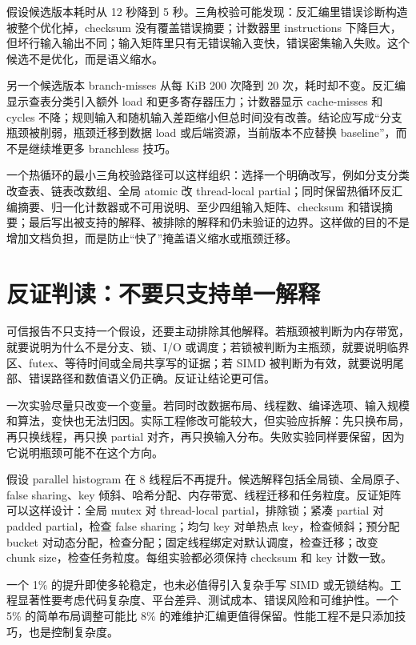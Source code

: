 假设候选版本耗时从 12 秒降到 5 秒。三角校验可能发现：反汇编里错误诊断构造被整个优化掉，checksum 没有覆盖错误摘要；计数器里 instructions 下降巨大，但坏行输入输出不同；输入矩阵里只有无错误输入变快，错误密集输入失败。这个候选不是优化，而是语义缩水。

另一个候选版本 branch-misses 从每 KiB 200 次降到 20 次，耗时却不变。反汇编显示查表分类引入额外 load 和更多寄存器压力；计数器显示 cache-misses 和 cycles 不降；规则输入和随机输入差距缩小但总时间没有改善。结论应写成“分支瓶颈被削弱，瓶颈迁移到数据 load 或后端资源，当前版本不应替换 baseline”，而不是继续堆更多 branchless 技巧。

一个热循环的最小三角校验路径可以这样组织：选择一个明确改写，例如分支分类改查表、链表改数组、全局 atomic 改 thread-local partial；同时保留热循环反汇编摘要、归一化计数器或不可用说明、至少四组输入矩阵、checksum 和错误摘要；最后写出被支持的解释、被排除的解释和仍未验证的边界。这样做的目的不是增加文档负担，而是防止“快了”掩盖语义缩水或瓶颈迁移。

\section{反证判读：不要只支持单一解释}

可信报告不只支持一个假设，还要主动排除其他解释。若瓶颈被判断为内存带宽，就要说明为什么不是分支、锁、I/O 或调度；若锁被判断为主瓶颈，就要说明临界区、futex、等待时间或全局共享写的证据；若 SIMD 被判断为有效，就要说明尾部、错误路径和数值语义仍正确。反证让结论更可信。

一次实验尽量只改变一个变量。若同时改数据布局、线程数、编译选项、输入规模和算法，变快也无法归因。实际工程修改可能较大，但实验应拆解：先只换布局，再只换线程，再只换 partial 对齐，再只换输入分布。失败实验同样要保留，因为它说明瓶颈可能不在这个方向。

假设 parallel histogram 在 8 线程后不再提升。候选解释包括全局锁、全局原子、false sharing、key 倾斜、哈希分配、内存带宽、线程迁移和任务粒度。反证矩阵可以这样设计：全局 mutex 对 thread-local partial，排除锁；紧凑 partial 对 padded partial，检查 false sharing；均匀 key 对单热点 key，检查倾斜；预分配 bucket 对动态分配，检查分配；固定线程绑定对默认调度，检查迁移；改变 chunk size，检查任务粒度。每组实验都必须保持 checksum 和 key 计数一致。

一个 1\% 的提升即使多轮稳定，也未必值得引入复杂手写 SIMD 或无锁结构。工程显著性要考虑代码复杂度、平台差异、测试成本、错误风险和可维护性。一个 5\% 的简单布局调整可能比 8\% 的难维护汇编更值得保留。性能工程不是只添加技巧，也是控制复杂度。

